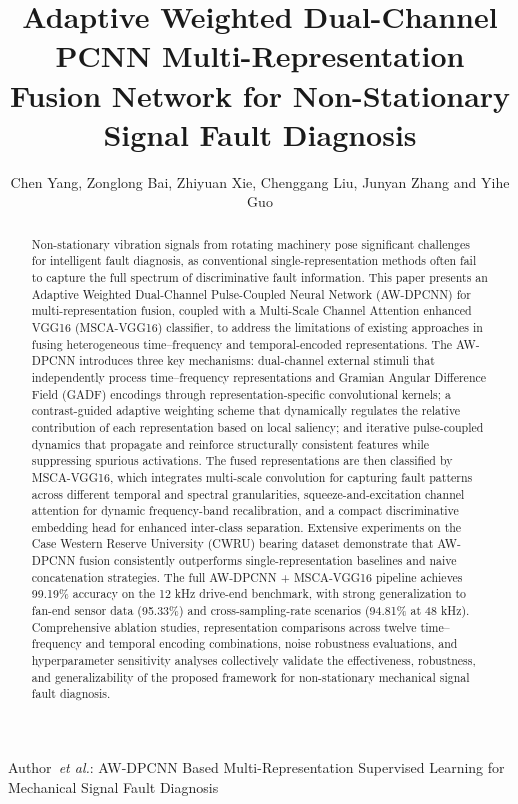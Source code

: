 \documentclass[journal]{IEEEtran}
\begin{document}
\title{Adaptive Weighted Dual-Channel PCNN Multi-Representation Fusion Network for Non-Stationary Signal Fault Diagnosis}

\author{Chen Yang, Zonglong Bai, Zhiyuan Xie, Chenggang Liu, Junyan Zhang and Yihe Guo}

{Author~\MakeLowercase{\textit{et al.}}: AW-DPCNN Based Multi-Representation Supervised Learning for Mechanical Signal Fault Diagnosis}

\maketitle

\begin{abstract}
Non-stationary vibration signals from rotating machinery pose significant challenges for intelligent fault diagnosis, as conventional single-representation methods often fail to capture the full spectrum of discriminative fault information. This paper presents an Adaptive Weighted Dual-Channel Pulse-Coupled Neural Network (AW-DPCNN) for multi-representation fusion, coupled with a Multi-Scale Channel Attention enhanced VGG16 (MSCA-VGG16) classifier, to address the limitations of existing approaches in fusing heterogeneous time--frequency and temporal-encoded representations. The AW-DPCNN introduces three key mechanisms: dual-channel external stimuli that independently process time--frequency representations and Gramian Angular Difference Field (GADF) encodings through representation-specific convolutional kernels; a contrast-guided adaptive weighting scheme that dynamically regulates the relative contribution of each representation based on local saliency; and iterative pulse-coupled dynamics that propagate and reinforce structurally consistent features while suppressing spurious activations. The fused representations are then classified by MSCA-VGG16, which integrates multi-scale convolution for capturing fault patterns across different temporal and spectral granularities, squeeze-and-excitation channel attention for dynamic frequency-band recalibration, and a compact discriminative embedding head for enhanced inter-class separation. Extensive experiments on the Case Western Reserve University (CWRU) bearing dataset demonstrate that AW-DPCNN fusion consistently outperforms single-representation baselines and naive concatenation strategies. The full AW-DPCNN + MSCA-VGG16 pipeline achieves 99.19\% accuracy on the 12 kHz drive-end benchmark, with strong generalization to fan-end sensor data (95.33\%) and cross-sampling-rate scenarios (94.81\% at 48 kHz). Comprehensive ablation studies, representation comparisons across twelve time--frequency and temporal encoding combinations, noise robustness evaluations, and hyperparameter sensitivity analyses collectively validate the effectiveness, robustness, and generalizability of the proposed framework for non-stationary mechanical signal fault diagnosis.
\end{abstract}
\end{document}
